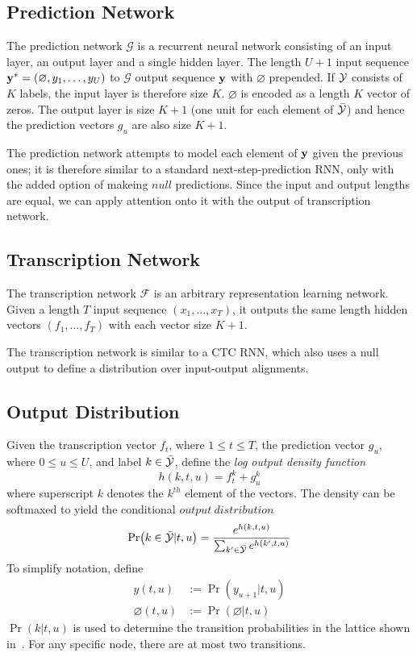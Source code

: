 \documentclass{article}
\begin{document}
\subsection{Prediction Network}
The prediction network $\mathcal{G}$ is a recurrent neural network consisting of an input layer, an output layer and a single hidden layer.
The length $U + 1$ input sequence $\mathbf{y}^* = (\varnothing, y_1, \dots, y_U)$ to $\mathcal{G}$ output sequence $\mathbf{y}$ with $\varnothing$ prepended.
If $\mathcal{Y}$ consists of $K$ labels, the input layer is therefore size $K$. $\varnothing$ is encoded as a length $K$ vector of zeros.
The output layer is size $K + 1$ (one unit for each element of $\bar{\mathcal{Y}}$) and hence the prediction vectors $g_u$ are also size $K + 1$.

The prediction network attempts to model each element of $\mathbf{y}$ given the previous ones; it is therefore similar to a standard next-step-prediction RNN, only with the added option of makeing $null$ predictions.
Since the input and output lengths are equal, we can apply attention onto it with the output of transcription network.

\subsection{Transcription Network}
The transcription network $\mathcal{F}$ is an arbitrary representation learning network.
Given a length $T$ input sequence $(x_1, \dots, x_T)$, it outputs the same length hidden vectors $(f_1, \dots, f_T)$ with each vector size $K + 1$.

The transcription network is similar to a CTC RNN, which also uses a null output to define a distribution over input-output alignments.

\subsection{Output Distribution}
Given the transcription vector $f_t$, where $1 \leq t \leq T$, the prediction vector $g_u$, where $0 \leq u \leq U$, and label $k \in \bar{\mathcal{Y}}$, define the \textit{log output density function}
\begin{equation} \label{eq:add}
    h(k, t, u) = f_t^k + g_u^k
\end{equation}
where superscript $k$ denotes the $k^{th}$ element of the vectors. The density can be softmaxed to yield the conditional $output\ distribution$
\begin{equation} \label{eq:softmax}
    \Pr(k \in \bar{\mathcal{Y}} | t, u) = \frac{e^{h(k, t, u)}}{\sum_{k' \in \bar{\mathcal{Y}}} e^{h(k', t, u)}}
\end{equation}
To simplify notation, define
\begin{equation}
    \begin{split}
        y(t, u) &:= \Pr(y_{u+1} | t, u) \\
        \varnothing(t, u) &:= \Pr(\varnothing | t, u)
    \end{split}
\end{equation}
$\Pr(k | t, u)$ is used to determine the transition probabilities in the lattice shown in~\cite{graves2012rnnt}. For any specific node, there are at most two transitions.
\end{document}
